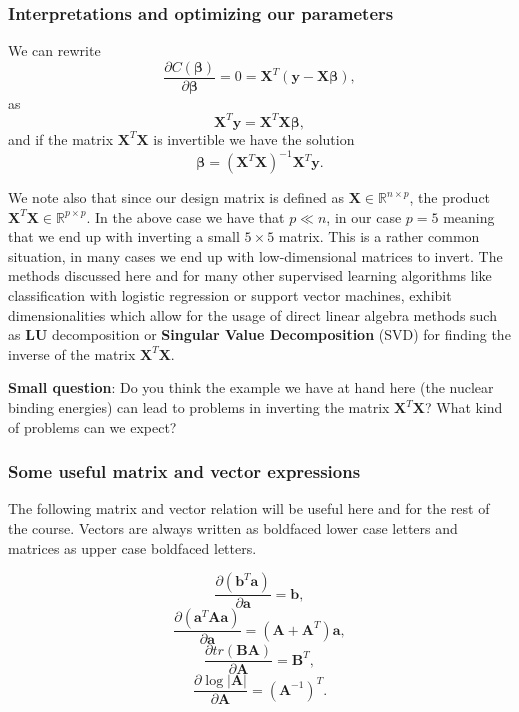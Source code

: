 \documentclass{beamer}
\begin{document}
\begin{frame}
\frametitle{Interpretations and optimizing our parameters}

\begin{block}{}
We can rewrite
\[
\frac{\partial C(\bm{\beta})}{\partial \bm{\beta}} = 0 = \bm{X}^T\left( \bm{y}-\bm{X}\bm{\beta}\right),  
\]
as
\[
\bm{X}^T\bm{y} = \bm{X}^T\bm{X}\bm{\beta},  
\]
and if the matrix $\bm{X}^T\bm{X}$ is invertible we have the solution
\[
\bm{\beta} =\left(\bm{X}^T\bm{X}\right)^{-1}\bm{X}^T\bm{y}.
\]

We note also that since our design matrix is defined as $\bm{X}\in
{\mathbb{R}}^{n\times p}$, the product $\bm{X}^T\bm{X} \in
{\mathbb{R}}^{p\times p}$.  In the above case we have that $p \ll n$,
in our case $p=5$ meaning that we end up with inverting a small
$5\times 5$ matrix. This is a rather common situation, in many cases we end up with low-dimensional
matrices to invert. The methods discussed here and for many other
supervised learning algorithms like classification with logistic
regression or support vector machines, exhibit dimensionalities which
allow for the usage of direct linear algebra methods such as \textbf{LU} decomposition or \textbf{Singular Value Decomposition} (SVD) for finding the inverse of the matrix
$\bm{X}^T\bm{X}$. 
\end{block}

\begin{block}{}
\textbf{Small question}: Do you think the example we have at hand here (the nuclear binding energies) can lead to problems in inverting the matrix  $\bm{X}^T\bm{X}$? What kind of problems can we expect? 
\end{block}
\end{frame}

\begin{frame}
\frametitle{Some useful matrix and vector expressions}

The following matrix and vector relation will be useful here and for the rest of the course. Vectors are always written as boldfaced lower case letters and 
matrices as upper case boldfaced letters. 

\[
\frac{\partial (\bm{b}^T\bm{a})}{\partial \bm{a}} = \bm{b},
\]
\[
\frac{\partial (\bm{a}^T\bm{A}\bm{a})}{\partial \bm{a}} = (\bm{A}+\bm{A}^T)\bm{a},
\]
\[
\frac{\partial tr(\bm{B}\bm{A})}{\partial \bm{A}} = \bm{B}^T,
\]
\[
\frac{\partial \log{\vert\bm{A}\vert}}{\partial \bm{A}} = (\bm{A}^{-1})^T.
\]
\end{frame}
\end{document}
